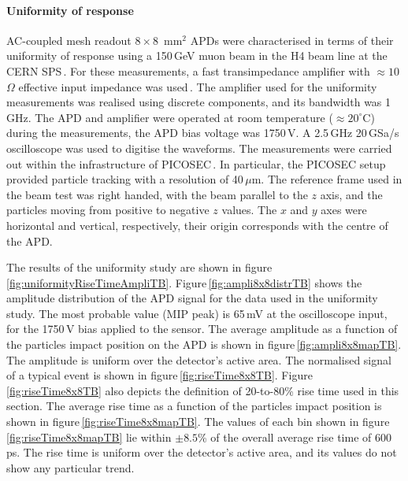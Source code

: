 \documentclass[review,number,sort&compress]{elsarticle}
\begin{document}
\paragraph{Uniformity of response}
AC-coupled mesh readout $8 \times 8$~mm$^2$ APDs were characterised in terms of their uniformity of response using a 150\,GeV muon beam in the H4 beam line at the CERN SPS\,\cite{h4page}.
For these measurements, a fast transimpedance amplifier with $\approx 10$\,$\Omega$ effective input impedance was used\,\cite{whiteACES2014}.
The amplifier used for the uniformity measurements was realised using discrete components, and its bandwidth was 1\,GHz.
The APD and amplifier were operated at room temperature ($\approx20^\circ$C) during the measurements, the APD bias voltage was 1750\,V.
A 2.5\,GHz 20\,GSa/s oscilloscope was used to digitise the waveforms.
The measurements were carried out within the infrastructure of PICOSEC\,\cite{bortfeld2018}.
In particular, the PICOSEC setup provided particle tracking with a resolution of 40\,$\mu$m.
The reference frame used in the beam test was right handed, with the beam parallel to the $z$ axis, and the particles moving from positive to negative $z$ values.
The $x$ and $y$ axes were horizontal and vertical, respectively, their origin corresponds with the centre of the APD.

The results of the uniformity study are shown in figure\,\ref{fig:uniformityRiseTimeAmpliTB}.
Figure\,\ref{fig:ampli8x8distrTB} shows the amplitude distribution of the APD signal for the data used in the uniformity study.
The most probable value (MIP peak) is 65\,mV at the oscilloscope input, for the 1750\,V bias applied to the sensor.
The average amplitude as a function of the particles impact position on the APD is shown in figure\,\ref{fig:ampli8x8mapTB}.
The amplitude is uniform over the detector's active area.
The normalised signal of a typical event is shown in figure\,\ref{fig:riseTime8x8TB}.
Figure\,\ref{fig:riseTime8x8TB} also depicts the definition of 20-to-80\% rise time used in this section.
The average rise time as a function of the particles impact position is shown in figure\,\ref{fig:riseTime8x8mapTB}.
The values of each bin shown in figure\,\ref{fig:riseTime8x8mapTB} lie within $\pm8.5$\% of the overall average rise time of 600\,ps.
The rise time is uniform over the detector's active area, and its values do not show any particular trend.
\end{document}
